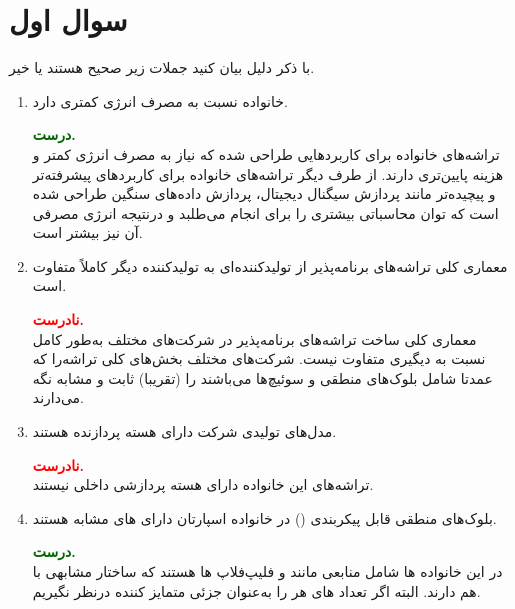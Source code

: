 \section{سوال اول}

با ذکر دلیل بیان کنید جملات زیر صحیح هستند یا خیر.

\begin{enumerate}
	\item 
	خانواده  نسبت به  مصرف انرژی کمتری دارد.
	\begin{qsolve}
		\textbf{\textcolor{darkgreen}{درست.}}\\
		تراشه‌های خانواده  برای کاربردهایی طراحی شده که نیاز به مصرف انرژی کمتر و هزینه پایین‌تری دارند. از طرف دیگر تراشه‌های خانواده  برای کاربردهای پیشرفته‌تر و پیچیده‌تر مانند پردازش سیگنال دیجیتال، پردازش داده‌های سنگین طراحی شده است که توان محاسباتی بیشتری را برای انجام می‌طلبد و درنتیجه انرژی مصرفی آن نیز بیشتر است.
	\end{qsolve}
	
	
	
	\item 
	معماری کلی تراشه‌های برنامه‌پذیر از تولیدکننده‌ای به تولیدکننده دیگر کاملاً متفاوت است.
	\begin{qsolve}
		\textbf{\textcolor{red}{نادرست.}}\\
		معماری کلی ساخت تراشه‌های برنامه‌پذیر در شرکت‌های مختلف به‌طور کامل نسبت به دیگیری متفاوت نیست. شرکت‌های مختلف بخش‌های کلی تراشه‌را که عمدتا شامل بلوک‌های منطقی و سوئیچ‌ها می‌باشند را (تقریبا) ثابت و مشابه نگه ‌می‌دارند.
	\end{qsolve}
	
	
	
	\item 
	مدل‌های  تولیدی شرکت  دارای هسته پردازنده  هستند.
	\begin{qsolve}
		\textbf{\textcolor{red}{نادرست.}}\\
		تراشه‌های این خانواده دارای هسته پردازشی داخلی نیستند.
	\end{qsolve}
	
	
	
	\item 
	بلوک‌های منطقی قابل پیکربندی () در خانواده اسپارتان دارای های مشابه هستند.
	\begin{qsolve}
		\textbf{\textcolor{darkgreen}{درست.}}\\
		در این خانواده ها شامل منابعی مانند  و فلیپ‌فلاپ ها هستند که ساختار مشابهی با هم دارند. البته اگر تعداد  های هر  را به‌عنوان جزئی متمایز کننده درنظر نگیریم.
	\end{qsolve}
	

\end{enumerate}
